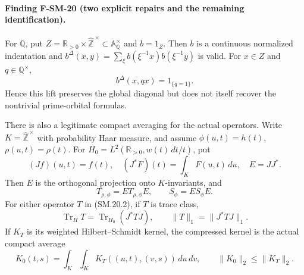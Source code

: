\documentclass[11pt,a4paper]{article}
\theoremstyle{definition}\newtheorem{definition}[theorem]{Definition}
\theoremstyle{remark}\newtheorem{remark}[theorem]{Remark}
\begin{document}
\paragraph{Finding F-SM-20 (two explicit repairs and the remaining identification).}
For $\mathbb Q$, put
$Z=\mathbb R_{>0}\times\widehat{\mathbb Z}^{\,\times}
\subset\mathbb A_{\mathbb Q}^\times$ and $b=1_Z$.
Then $b$ is a continuous normalized indentation and
$b^\Delta(x,y)=\sum_\xi b(\xi^{-1}x)b(\xi^{-1}y)$ is valid.
For $x\in Z$ and $q\in\mathbb Q^\times$,
\[
 b^\Delta(x,qx)=1_{\{q=1\}}.
 \tag{SM.20.1}
\]
Hence this lift preserves the global diagonal but does not itself
recover the nontrivial prime-orbital formulas.

There is also a legitimate compact averaging for the actual operators.
Write $K=\widehat{\mathbb Z}^{\,\times}$ with probability Haar
measure, and assume $\phi(u,t)=h(t)$, $\rho(u,t)=\rho(t)$.
For $H_0=L^2(\mathbb R_{>0},w(t)\,dt/t)$, put
\[
 (Jf)(u,t)=f(t),\quad (J^*F)(t)=\int_KF(u,t)\,du,\quad E=JJ^*.
\]
Then $E$ is the orthogonal projection onto $K$-invariants, and
\[
 T_{\rho,\phi}=ET_{\rho,\phi}E,\qquad S_\phi=ES_\phi E.
 \tag{SM.20.2}
\]
For either operator $T$ in (SM.20.2), if $T$ is trace class,
\[
 \operatorname{Tr}_H T=\operatorname{Tr}_{H_0}(J^*TJ),
 \qquad \|T\|_1=\|J^*TJ\|_1.
 \tag{SM.20.3}
\]
If $K_T$ is its weighted Hilbert--Schmidt kernel, the compressed
kernel is the actual compact average
\[
 K_0(t,s)=\int_K\int_KK_T((u,t),(v,s))\,du\,dv,\qquad
 \|K_0\|_2\leq\|K_T\|_2.
 \tag{SM.20.4}
\]
\end{document}
